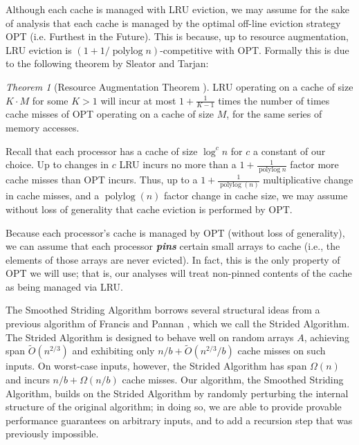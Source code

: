 \documentclass[sigplan, 10pt, nonacm]{acmart}
\newcommand{\polylog}{\operatorname{polylog}}
\newcommand{\defn}[1]{{\textit{\textbf{\boldmath #1}}}}
\renewcommand{\paragraph}[1]{\vspace{0.09in}\noindent{\bf \boldmath #1.}}
\theoremstyle{remark}
\newtheorem{theorem}{Theorem}[section]
\theoremstyle{remark}
\begin{document}
Although each cache is managed with LRU eviction, we may assume
for the sake of analysis that each cache is managed by the optimal
off-line eviction strategy OPT (i.e. Furthest in the Future). This is
because, up to resource augmentation, LRU eviction is $(1 + 1/\polylog
n)$-competitive with OPT. Formally this is due to the following
theorem by Sleator and Tarjan:
\begin{theorem}[Resource Augmentation Theorem \cite{SleatorTa85}]
  LRU operating on a cache of size $K\cdot M$ for some $K>1$ will incur at most
  $1+\frac{1}{K-1}$ times the number of times cache misses of OPT operating on
  a cache of size $M$, for the same series of memory accesses.
  \label{thm:augmentation}
\end{theorem}

Recall that each processor has a cache of size $\log^c n$ for $c$ a
constant of our choice.  Up to changes in $c$ LRU incurs no more than
a $1+\frac{1}{\operatorname{polylog}{n}}$ factor more cache misses
than OPT incurs. Thus, up to a $1 + \frac{1}{\polylog(n)}$
multiplicative change in cache misses, and a $\polylog(n)$ factor change in
cache size, we may assume without loss of generality that cache
eviction is performed by OPT.

Because each processor's cache is managed by OPT (without loss of
generality), we can assume that each processor \defn{pins} certain
small arrays to cache (i.e., the elements of those arrays are never
evicted). In fact, this is the only property of OPT we will use; that
is, our analyses will treat non-pinned contents of the cache as being
managed via LRU.

\paragraph{The Strided Algorithm \cite{FrancisPa92}}
The Smoothed Striding Algorithm borrows several structural ideas from a previous algorithm of Francis and Pannan \cite{FrancisPa92}, which we call the Strided Algorithm. The Strided Algorithm is designed to behave well on random arrays $A$, achieving span $\tilde{O}(n^{2/3})$ and exhibiting only $n/b + \tilde{O}(n^{2/3} / b)$  cache misses on such inputs. On worst-case inputs, however, the Strided Algorithm has span $\Omega(n)$ and incurs $n/b + \Omega(n/b)$ cache misses. Our algorithm, the Smoothed Striding Algorithm, builds on the Strided Algorithm by randomly perturbing the internal structure of the original algorithm; in doing so, we are able to provide provable performance guarantees on arbitrary inputs, and to add a recursion step that was previously impossible.
\end{document}
